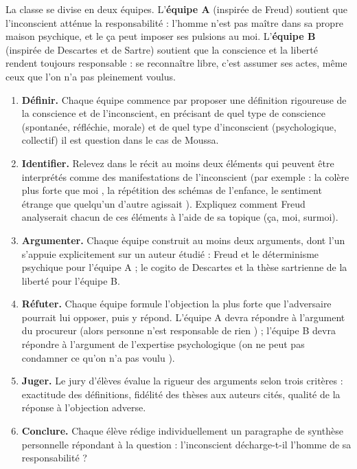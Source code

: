 \documentclass[11pt]{article}
\newcommand{\cle}[1]{{\popxbold\color{popdark}#1}}
\newcounter{popsec}
\newcounter{popsub}
\newcommand{\courssub}[1]{%
  \stepcounter{popsub}%
  \par\vspace{9pt}\noindent{\popxbold\fontsize{11.5}{13}\selectfont\color{popink}{\color{poporange}\thepopsec.\thepopsub}\hspace{6pt}#1}\par\nopagebreak\vspace{4pt}
}
\begin{document}
La classe se divise en deux équipes. L'\textbf{équipe A} (inspirée de Freud) soutient que l'inconscient atténue la responsabilité : l'homme n'est pas maître dans sa propre maison psychique, et le ça peut imposer ses pulsions au moi. L'\textbf{équipe B} (inspirée de Descartes et de Sartre) soutient que la conscience et la liberté rendent toujours responsable : se reconnaître libre, c'est assumer ses actes, même ceux que l'on n'a pas pleinement voulus.

\courssub{Consignes}

\begin{enumerate}
\item \textbf{Définir.} Chaque équipe commence par proposer une définition rigoureuse de la \cle{conscience} et de l'\cle{inconscient}, en précisant de quel type de conscience (spontanée, réfléchie, morale) et de quel type d'inconscient (psychologique, collectif) il est question dans le cas de Moussa.
\item \textbf{Identifier.} Relevez dans le récit au moins deux éléments qui peuvent être interprétés comme des manifestations de l'inconscient (par exemple : la colère \guillemotleft plus forte que moi \guillemotright, la répétition des schémas de l'enfance, le sentiment étrange que \guillemotleft quelqu'un d'autre agissait \guillemotright). Expliquez comment Freud analyserait chacun de ces éléments à l'aide de sa topique (ça, moi, surmoi).
\item \textbf{Argumenter.} Chaque équipe construit au moins deux arguments, dont l'un s'appuie explicitement sur un auteur étudié : Freud et le déterminisme psychique pour l'équipe A ; le cogito de Descartes et la thèse sartrienne de la liberté pour l'équipe B.
\item \textbf{Réfuter.} Chaque équipe formule l'objection la plus forte que l'adversaire pourrait lui opposer, puis y répond. L'équipe A devra répondre à l'argument du procureur (\guillemotleft alors personne n'est responsable de rien \guillemotright) ; l'équipe B devra répondre à l'argument de l'expertise psychologique (\guillemotleft on ne peut pas condamner ce qu'on n'a pas voulu \guillemotright).
\item \textbf{Juger.} Le jury d'élèves évalue la rigueur des arguments selon trois critères : exactitude des définitions, fidélité des thèses aux auteurs cités, qualité de la réponse à l'objection adverse.
\item \textbf{Conclure.} Chaque élève rédige individuellement un paragraphe de synthèse personnelle répondant à la question : l'inconscient décharge-t-il l'homme de sa responsabilité ?
\end{enumerate}
\end{document}
